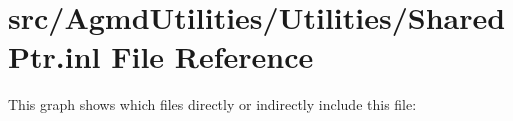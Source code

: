 \hypertarget{_shared_ptr_8inl}{\section{src/\+Agmd\+Utilities/\+Utilities/\+Shared\+Ptr.inl File Reference}
\label{_shared_ptr_8inl}
}
This graph shows which files directly or indirectly include this file\+:
